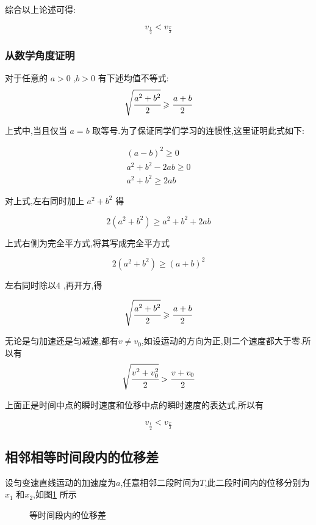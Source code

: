 综合以上论述可得:

\begin{equation}
  v_{\frac{t}{2}} < v_{\frac{x}{2}} 
  \label{eq:v-t<x}
\end{equation}

\subsubsection{从数学角度证明}

对于任意的 $a>0$ ,$b>0$ 有下述均值不等式:
\[
  \sqrt{\cfrac{a^2+b^2}{2}}\geqslant\cfrac{a+b}{2}
\]

上式中,当且仅当 $a=b$ 取等号.为了保证同学们学习的连惯性,这里证明此式如下:

\begin{gather*}
 (a-b)^2 \geqslant 0\\
 a^2+b^2 -2ab \geqslant 0\\
 a^2+b^2 \geqslant 2ab
\end{gather*}

对上式,左右同时加上 $a^2+b^2$ 得

\[
2(a^2+b^2) \geqslant a^2+b^2+2ab
\]

上式右侧为完全平方式,将其写成完全平方式

\[
2(a^2+b^2) \geqslant (a+b)^2
\]

左右同时除以$4$ ,再开方,得

\[
  \sqrt{\cfrac{a^2+b^2}{2}}\geqslant\cfrac{a+b}{2}
\]

无论是匀加速还是匀减速,都有$ v\neq v_0$,如设运动的方向为正,则二个速度都大于零.所以有
\[
  \sqrt{\cfrac{v^2+v_0^2}{2}}
  >
  \cfrac{v+v_0}{2}
\]

上面正是时间中点的瞬时速度和位移中点的瞬时速度的表达式,所以有

\begin{equation*}
  v_{\frac{t}{2}} < v_{\frac{x}{2}} 
\end{equation*}

\subsection{相邻相等时间段内的位移差}
设匀变速直线运动的加速度为$a$,任意相邻二段时间为$T$,此二段时间内的位移分别为$x_1$ 和$x_2$,如图\ref{fig:Delta x} 所示
\begin{figure}[H]
  \centering
  \caption{等时间段内的位移差}
  \label{fig:Delta x}
\end{figure}

